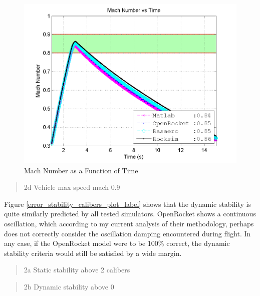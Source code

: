 \documentclass[]{article}
\begin{document}
\begin{figure}[htbp]
\centering
\includegraphics{images/plots/error_mach_plot.png}
\caption{Mach Number as a Function of Time
\label{error_mach_plot_label}}
\end{figure}

\begin{quote}
2d Vehicle max speed mach 0.9
\end{quote}

\clearpage

Figure \ref{error_stability_calibers_plot_label} shows that the dynamic
stability is quite similarly predicted by all tested simulators.
OpenRocket shows a continuous oscillation, which according to my current
analysis of their methodology, perhaps does not correctly consider the
oscillation damping encountered during flight. In any case, if the
OpenRocket model were to be 100\% correct, the dynamic stability
criteria would still be satisfied by a wide margin.

\begin{quote}
2a Static stability above 2 calibers
\end{quote}

\begin{quote}
2b Dynamic stability above 0
\end{quote}
\end{document}
